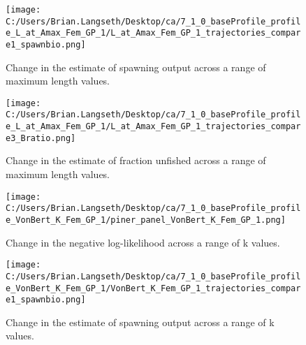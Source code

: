 \documentclass[11pt,
  english,
  a4paper,
]{article}
\begin{document}

\begin{figure}
\centering
\texttt{[image: C:/Users/Brian.Langseth/Desktop/ca/7\_1\_0\_baseProfile\_profile\_L\_at\_Amax\_Fem\_GP\_1/L\_at\_Amax\_Fem\_GP\_1\_trajectories\_compare1\_spawnbio.png]}
\caption{Change in the estimate of spawning output across a range of maximum length values.\label{fig:linf-ssb}}
\end{figure}

\tagmcend\tagstructend


\begin{figure}
\centering
\texttt{[image: C:/Users/Brian.Langseth/Desktop/ca/7\_1\_0\_baseProfile\_profile\_L\_at\_Amax\_Fem\_GP\_1/L\_at\_Amax\_Fem\_GP\_1\_trajectories\_compare3\_Bratio.png]}
\caption{Change in the estimate of fraction unfished across a range of maximum length values.\label{fig:linf-depl}}
\end{figure}

\tagmcend\tagstructend


\begin{figure}
\centering
\texttt{[image: C:/Users/Brian.Langseth/Desktop/ca/7\_1\_0\_baseProfile\_profile\_VonBert\_K\_Fem\_GP\_1/piner\_panel\_VonBert\_K\_Fem\_GP\_1.png]}
\caption{Change in the negative log-likelihood across a range of k values.\label{fig:k-profile}}
\end{figure}

\tagmcend\tagstructend


\begin{figure}
\centering
\texttt{[image: C:/Users/Brian.Langseth/Desktop/ca/7\_1\_0\_baseProfile\_profile\_VonBert\_K\_Fem\_GP\_1/VonBert\_K\_Fem\_GP\_1\_trajectories\_compare1\_spawnbio.png]}
\caption{Change in the estimate of spawning output across a range of k values.\label{fig:k-ssb}}
\end{figure}
\end{document}
